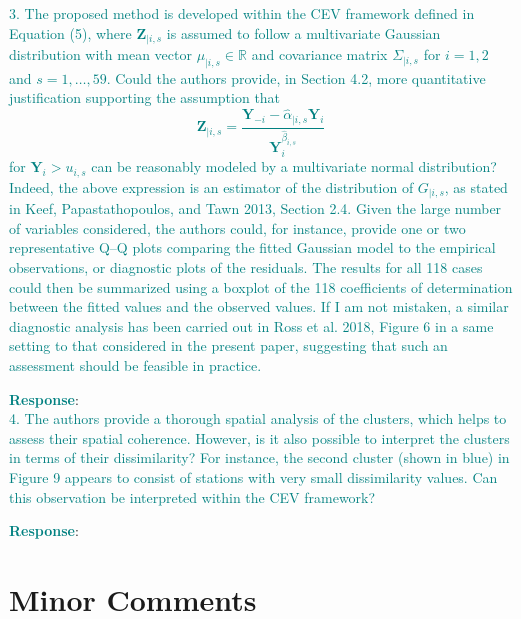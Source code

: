 \documentclass[a4paper,12pt]{article}
\begin{document}
\noindent \textcolor{teal}{
3. The proposed method is developed within the CEV framework defined in Equation (5), where
$\boldsymbol{Z}_{\mid i, s}$ is assumed to follow a multivariate Gaussian distribution with mean vector $\mu_{\mid i, s} \in \mathbb{R}$ and covariance matrix 
$\Sigma_{\mid i, s}$ for $i = 1, 2$ and $s = 1, \ldots, 59$. 
Could the authors provide, in Section 4.2, more quantitative justification supporting the assumption that
\[
  \boldsymbol{Z}_{\mid i, s} = \frac{\boldsymbol{Y}_{-i}-\hat{\alpha}_{\mid i, s}\boldsymbol{Y}_i}{\boldsymbol{Y}_{i}^{\hat{\beta}_{i, s}}}
\]
for $\boldsymbol{Y}_i > u_{i, s}$ can be reasonably modeled by a multivariate normal distribution? 
Indeed, the above expression is an estimator of the distribution of $G_{\mid i, s}$, as stated in Keef, Papastathopoulos, and Tawn 2013, Section 2.4. 
Given the large number of variables considered, the authors could, for instance, provide one or two representative Q–Q plots comparing the fitted Gaussian model to the empirical observations, or diagnostic plots of the residuals. 
The results for all 118 cases could then be summarized using a boxplot of the 118 coefficients of determination between the fitted values and the observed values. 
If I am not mistaken, a similar diagnostic analysis has been carried out in Ross et al. 2018, Figure 6 in a same setting to that considered in the present paper, suggesting that such an assessment should be feasible in practice.
}

\noindent \textcolor{teal}{\bf Response}: \\



\noindent \textcolor{teal}{
4. The authors provide a thorough spatial analysis of the clusters, which helps to assess their
spatial coherence. 
However, is it also possible to interpret the clusters in terms of their dissimilarity? 
For instance, the second cluster (shown in blue) in Figure 9 appears to consist of stations with very small dissimilarity values. 
Can this observation be interpreted within the CEV framework?
}

\noindent \textcolor{teal}{\bf Response}: \\

\section*{{Minor Comments}}
\end{document}
